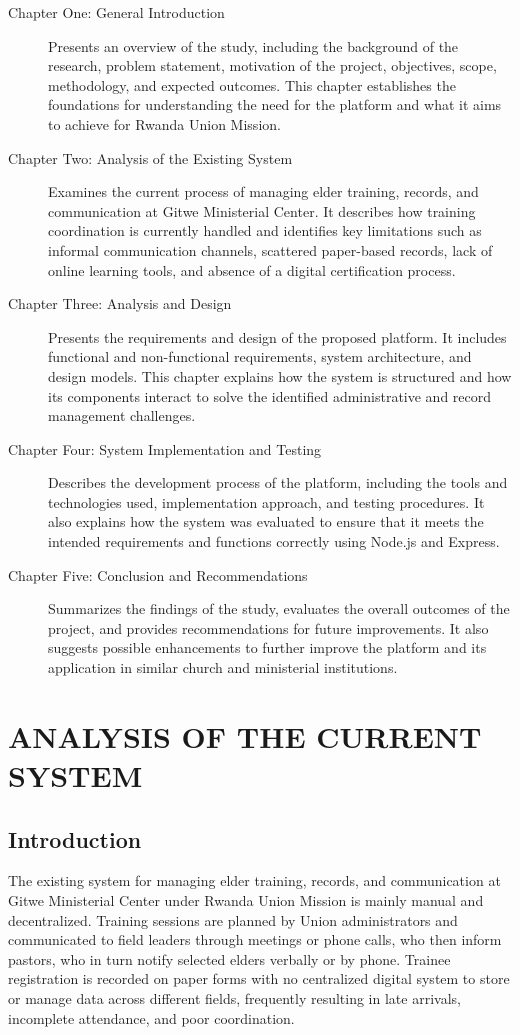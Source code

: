 \documentclass[12pt]{report}
\begin{document}
\begin{description}
    \item[Chapter One: General Introduction] Presents an overview of the study, including the background of the research, problem statement, motivation of the project, objectives, scope, methodology, and expected outcomes. This chapter establishes the foundations for understanding the need for the platform and what it aims to achieve for Rwanda Union Mission.
    \item[Chapter Two: Analysis of the Existing System] Examines the current process of managing elder training, records, and communication at Gitwe Ministerial Center. It describes how training coordination is currently handled and identifies key limitations such as informal communication channels, scattered paper-based records, lack of online learning tools, and absence of a digital certification process.
    \item[Chapter Three: Analysis and Design] Presents the requirements and design of the proposed platform. It includes functional and non-functional requirements, system architecture, and design models. This chapter explains how the system is structured and how its components interact to solve the identified administrative and record management challenges.
    \item[Chapter Four: System Implementation and Testing] Describes the development process of the platform, including the tools and technologies used, implementation approach, and testing procedures. It also explains how the system was evaluated to ensure that it meets the intended requirements and functions correctly using Node.js and Express.
    \item[Chapter Five: Conclusion and Recommendations] Summarizes the findings of the study, evaluates the overall outcomes of the project, and provides recommendations for future improvements. It also suggests possible enhancements to further improve the platform and its application in similar church and ministerial institutions.
\end{description}

\chapter{ANALYSIS OF THE CURRENT SYSTEM}

\section{Introduction}
The existing system for managing elder training, records, and communication at Gitwe Ministerial Center under Rwanda Union Mission is mainly manual and decentralized. Training sessions are planned by Union administrators and communicated to field leaders through meetings or phone calls, who then inform pastors, who in turn notify selected elders verbally or by phone. Trainee registration is recorded on paper forms with no centralized digital system to store or manage data across different fields, frequently resulting in late arrivals, incomplete attendance, and poor coordination.
\end{document}
